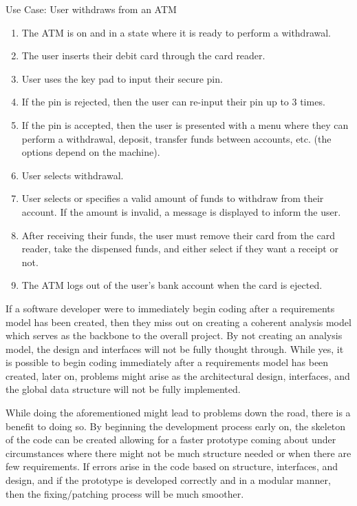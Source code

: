 	Use Case: User withdraws from an ATM
	\begin{enumerate}
		\item The ATM is on and in a state where it is ready to perform a withdrawal.
		\item The user inserts their debit card through the card reader.
		\item User uses the key pad to input their secure pin.
		\item If the pin is rejected, then the user can re-input their pin up to 3 times.
		\item If the pin is accepted, then the user is presented with a menu where they can perform a withdrawal, deposit, transfer funds between accounts, etc. (the options depend on the machine).
		\item User selects withdrawal.
		\item User selects or specifies a valid amount of funds to withdraw from their account. If the amount is invalid, a message is displayed to inform the user.
		\item After receiving their funds, the user must remove their card from the card reader, take the dispensed funds, and either select if they want a receipt or not.
		\item The ATM logs out of the user's bank account when the card is ejected.
	\end{enumerate}

	If a software developer were to immediately begin coding after a requirements model has been created, then they miss out on creating a coherent analysis model which serves as the backbone to the overall project. By not creating an analysis model, the design and interfaces will not be fully thought through. While yes, it is possible to begin coding immediately after a requirements model has been created, later on, problems might arise as the architectural design, interfaces, and the global data structure will not be fully implemented.

	While doing the aforementioned might lead to problems down the road, there is a benefit to doing so. By beginning the development process early on, the skeleton of the code can be created allowing for a faster prototype coming about under circumstances where there might not be much structure needed or when there are few requirements. If errors arise in the code based on structure, interfaces, and design, and if the prototype is developed correctly and in a modular manner, then the fixing/patching process will be much smoother. 

